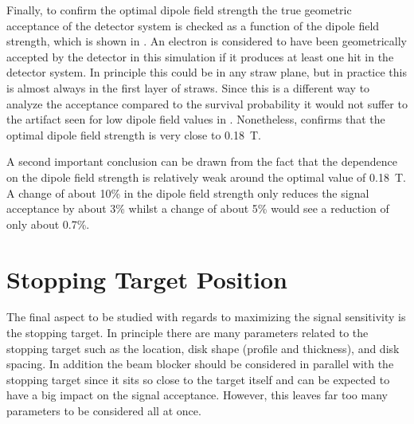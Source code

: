 \FigOptimESTDipoleAcceptanceVsDipole
Finally, to confirm the optimal dipole field strength the true geometric acceptance of the detector system is checked as a function of the dipole field strength, which is shown in .
An electron is considered to have been geometrically accepted by the detector in this simulation if it produces at least one hit in the detector system.
In principle this could be in any straw plane, but in practice this is almost always in the first layer of straws.
Since this is a different way to analyze the acceptance compared to the survival probability it would not suffer to the artifact seen for low dipole field values in .
Nonetheless,  confirms that the optimal dipole field strength is very close to 0.18~T.

A second important conclusion can be drawn from the fact that the dependence on the dipole field strength is relatively weak around the optimal value of 0.18~T.
A change of about 10\% in the dipole field strength only reduces the signal acceptance by about 3\% whilst a change of about 5\% would see a reduction of only about 0.7\%.


\section{Stopping Target Position}
The final aspect to be studied with regards to maximizing the signal sensitivity is the stopping target.
In principle there are many parameters related to the stopping target such as the location, disk shape (profile and thickness), and disk spacing.
In addition the beam blocker should be considered in parallel with the stopping target since it sits so close to the target itself and can be expected to have a big impact on the signal acceptance.
However, this leaves far too many parameters to be considered all at once.

